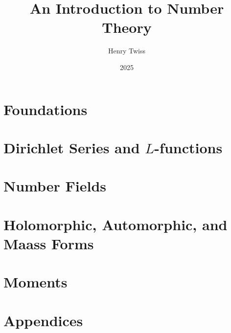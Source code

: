\documentclass[12pt,oneside]{book}
\title{An Introduction to Number Theory}
\author{Henry Twiss}
\date{2025}
\begin{document}
\maketitle
\pagestyle{empty}
\tableofcontents
\setcounter{page}{0}
\pagestyle{fancy}

\part{Foundations}
  

\part{Dirichlet Series and \texorpdfstring{$L$}{L}-functions}
  
  
  

\part{Number Fields}
  
  
  
  

\part{Holomorphic, Automorphic, and Maass Forms}
  
  
  
  
  

\part{Moments}
  
  
  

\part{Appendices}
  

\printindex


\end{document}
